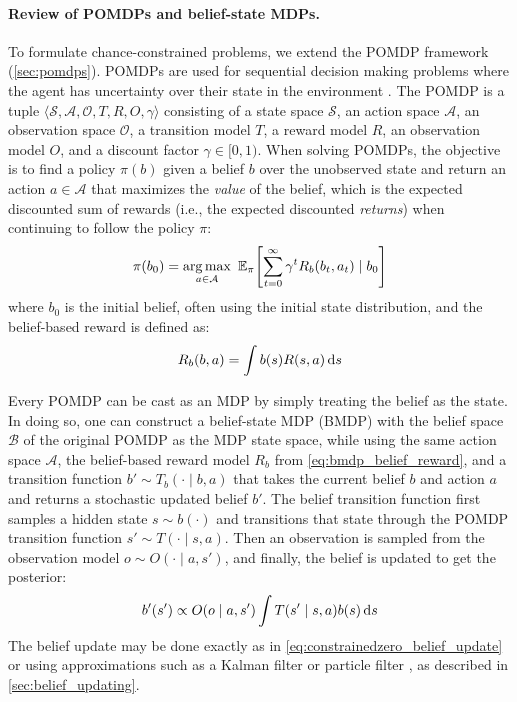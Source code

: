 \paragraph{Review of POMDPs and belief-state MDPs.}
To formulate chance-constrained problems, we extend the POMDP framework (\cref{sec:pomdps}).
POMDPs are used for sequential decision making problems where the agent has uncertainty over their state in the environment \cite{dmbook}.
The POMDP is a tuple $\langle \mathcal{S}, \mathcal{A}, \mathcal{O}, T, R, O, \gamma \rangle$ consisting of a state space $\mathcal{S}$,
an action space $\mathcal{A}$,
an observation space $\mathcal{O}$,
a transition model $T$,
a reward model $R$,
an observation model $O$,
and a discount factor $\gamma \in [0, 1)$.
When solving POMDPs, the objective is to find a policy $\pi(b)$ given a belief $b$ over the unobserved state and return an action $a \in \mathcal{A}$ that maximizes the \textit{value} of the belief, which is the expected discounted sum of rewards (i.e., the expected discounted \textit{returns}) when continuing to follow the policy $\pi$:
\begin{equation}
    \pi(b_0) = \argmax_{a \in \mathcal{A}} \ \mathbb{E}_\pi\!\left[\sum_{t=0}^\infty \gamma^t R_b(b_t, a_t) \mid b_0 \right]
\end{equation}
where $b_0$ is the initial belief, often using the initial state distribution, and the belief-based reward is defined as:
\begin{equation}
R_b(b,a) = \int b(s)R(s,a) \mathop{}\!\mathrm{d} s \label{eq:bmdp_belief_reward}
\end{equation}

Every POMDP can be cast as an MDP by simply treating the belief as the state.
In doing so, one can construct a belief-state MDP (BMDP) with the belief space $\mathcal{B}$ of the original POMDP as the MDP state space, while using the same action space $\mathcal{A}$, the belief-based reward model $R_b$ from \cref{eq:bmdp_belief_reward}, and a transition function $b' \sim T_b(\cdot \mid b, a)$ that takes the current belief $b$ and action $a$ and returns a stochastic updated belief $b'$.
The belief transition function first samples a hidden state $s \sim b(\cdot)$ and transitions that state through the POMDP transition function $s' \sim T(\cdot \mid s, a)$.
Then an observation is sampled from the observation model $o \sim O(\cdot \mid a, s')$, and finally, the belief is updated to get the posterior:
\begin{equation}
    b'(s') \propto O(o \mid a, s') \int T(s' \mid s, a)b(s) \mathop{}\!\mathrm{d} s \label{eq:constrainedzero_belief_update}
\end{equation}
The belief update may be done exactly as in \cref{eq:constrainedzero_belief_update} or using approximations such as a Kalman filter \cite{wan2000unscented} or particle filter \cite{thrun2005probabilistic}, as described in \cref{sec:belief_updating}.


